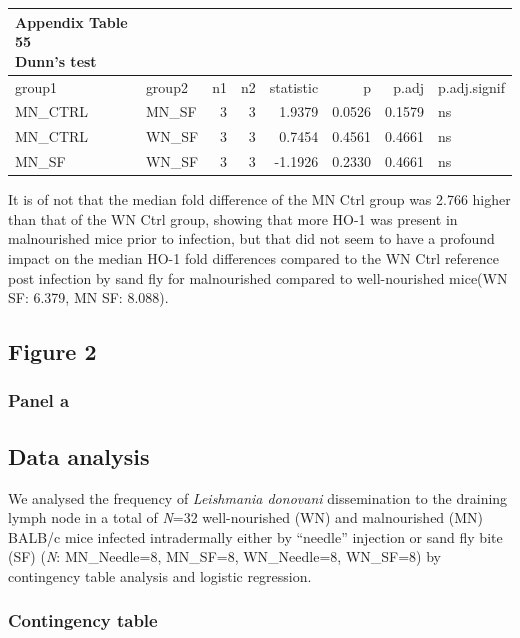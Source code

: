 \documentclass[
  12pt,
  letterpaper,
]{article}
\begin{document}
\begin{longtable}{llrrrrrl}
\caption*{
{\large \textbf{Appendix Table 55}} \\ 
{\small \textbf{Dunn's test}}
} \\ 
\toprule
group1 & group2 & n1 & n2 & statistic & p & p.adj & p.adj.signif \\ 
\midrule\addlinespace[2.5pt]
MN\_CTRL & MN\_SF & 3 & 3 & 1.9379 & 0.0526 & 0.1579 & ns \\ 
MN\_CTRL & WN\_SF & 3 & 3 & 0.7454 & 0.4561 & 0.4661 & ns \\ 
MN\_SF & WN\_SF & 3 & 3 & -1.1926 & 0.2330 & 0.4661 & ns \\ 
\bottomrule
\end{longtable}

It is of not that the median fold difference of the MN Ctrl group was 2.766 higher than that of the WN Ctrl group, showing that more HO-1 was present in malnourished mice prior to infection, but that did not seem to have a profound impact on the median HO-1 fold differences compared to the WN Ctrl reference post infection by sand fly for malnourished compared to well-nourished mice(WN SF: 6.379, MN SF: 8.088).

\subsection{Figure 2}\label{figure-2}

\subsubsection{Panel a}\label{panel-a}

\subsection{Data analysis}\label{data-analysis-2}

We analysed the frequency of \emph{Leishmania donovani} dissemination to the draining lymph node in a total of \emph{N}=32 well-nourished (WN) and malnourished (MN) BALB/c mice infected intradermally either by ``needle'' injection or sand fly bite (SF) (\emph{N}: MN\_Needle=8, MN\_SF=8, WN\_Needle=8, WN\_SF=8) by contingency table analysis and logistic regression.

\subsubsection{Contingency table}\label{contingency-table}
\end{document}
